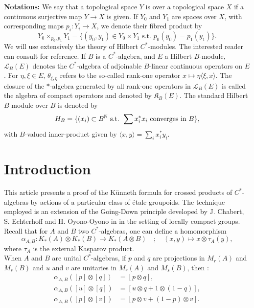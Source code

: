 \newpage
\textbf{Notations:} We say that a topological space $Y$ is over a topological space $X$ if a continuous surjective map $Y \rightarrow X$ is given. If $Y_0$ and $Y_1$ are spaces over $X$, with corresponding maps $p_i: Y_i \rightarrow X$, we denote their fibred product by 
\[ Y_0 \times_{p_0,p_1} Y_1 = \{ (y_0,y_1) \in Y_0 \times Y_1 \text{ s.t. } p_0(y_0) = p_1(y_1) \}.\]
We will use extensively the theory of Hilbert $C^*$-modules. The interested reader can consult \cite{Lance} for reference. If $B$ is a $C^*$-algebra, and $E$ a Hilbert $B$-module, $\mathcal L_B(E)$ denotes the $C^*$-algebra of adjoinable $B$-linear continuous operators on $E$. For $\eta,\xi\in E$, $\theta_{\xi,\eta}$ refers to the so-called rank-one operator $x\mapsto \eta\langle \xi, x \rangle $. The closure of the $*$-algebra generated by all rank-one operators in $\mathcal L_B(E)$ is called the algebra of compact operators and denoted by $\mathfrak K_B(E)$. The standard Hilbert $B$-module over $B$ is denoted by 
\[H_B = \{(x_i)\subset B^\mathbb N \text{ s.t. } \sum x_i^* x_i \text{ converges in }B \}, \]
with $B$-valued inner-product given by $\langle x, y \rangle = \sum_i x_i^* y_i$. 

\section{Introduction}

This article presents a proof of the Künneth formula for crossed products of $C^*$-algebras by actions of a particular class of \'etale groupoids. The technique employed is an extension of the Going-Down principle developed by J. Chabert, S. Echterhoff and H. Oyono-Oyono in \cite{ChabertEOY} in the setting of locally compact groups.   \\

Recall that for $A$ and $B$ two $C^*$-algebras, one can define a homomorphism
\[\alpha_{A,B} : K_*(A)\otimes K_*(B)\rightarrow K_*(A\otimes B) \quad ; \quad (x,y)\mapsto x\otimes   \tau_A(y),\]
where $\tau_A$ is the external Kasparov product.\\

When $A$ and $B$ are unital $C^*$-algebras, if $p$ and $q$ are projections in $M_r(A)$ and $M_s(B)$ and $u$ and $v$ are unitaries in $M_r(A)$ and $M_s(B)$, then :
\[\begin{array}{rl}
\alpha_{A,B}([p]\otimes [q]) & = [p\otimes q], \\
\alpha_{A,B}([u]\otimes [q]) & = [u \otimes q +1\otimes (1-q)], \\
\alpha_{A,B}([p]\otimes [v]) & = [p\otimes v +(1-p)\otimes v] .\\
\end{array}\]

